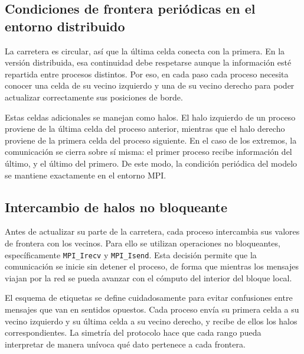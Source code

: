 \subsection{Condiciones de frontera periódicas en el entorno distribuido}
\label{sec:frontera}

La carretera es circular, así que la última celda conecta con la primera. En la versión distribuida, esa continuidad debe respetarse aunque la información esté repartida entre procesos distintos. Por eso, en cada paso cada proceso necesita conocer una celda de su vecino izquierdo y una de su vecino derecho para poder actualizar correctamente sus posiciones de borde.

Estas celdas adicionales se manejan como halos. El halo izquierdo de un proceso proviene de la última celda del proceso anterior, mientras que el halo derecho proviene de la primera celda del proceso siguiente. En el caso de los extremos, la comunicación se cierra sobre sí misma: el primer proceso recibe información del último, y el último del primero. De este modo, la condición periódica del modelo se mantiene exactamente en el entorno MPI.

\subsection{Intercambio de halos no bloqueante}

Antes de actualizar su parte de la carretera, cada proceso intercambia sus valores de frontera con los vecinos. Para ello se utilizan operaciones no bloqueantes, específicamente \texttt{MPI\_Irecv} y \texttt{MPI\_Isend}. Esta decisión permite que la comunicación se inicie sin detener el proceso, de forma que mientras los mensajes viajan por la red se pueda avanzar con el cómputo del interior del bloque local.

El esquema de etiquetas se define cuidadosamente para evitar confusiones entre mensajes que van en sentidos opuestos. Cada proceso envía su primera celda a su vecino izquierdo y su última celda a su vecino derecho, y recibe de ellos los halos correspondientes. La simetría del protocolo hace que cada rango pueda interpretar de manera unívoca qué dato pertenece a cada frontera.

